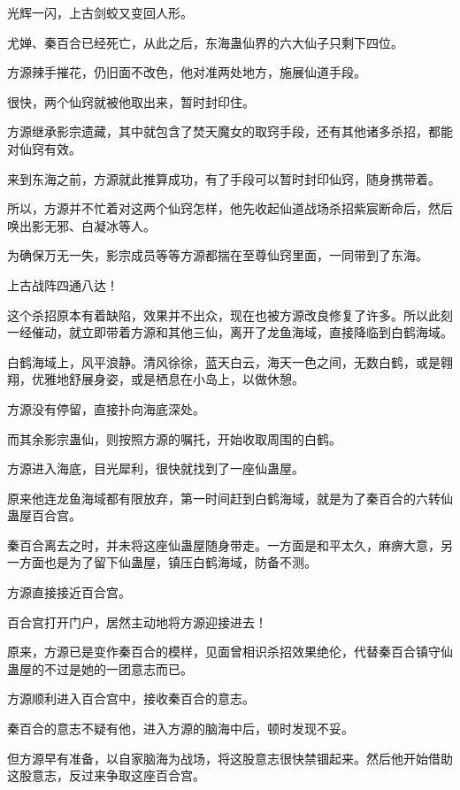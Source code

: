 
\begin{this_body}

光辉一闪，上古剑蛟又变回人形。

尤婵、秦百合已经死亡，从此之后，东海蛊仙界的六大仙子只剩下四位。

方源辣手摧花，仍旧面不改色，他对准两处地方，施展仙道手段。

很快，两个仙窍就被他取出来，暂时封印住。

方源继承影宗遗藏，其中就包含了焚天魔女的取窍手段，还有其他诸多杀招，都能对仙窍有效。

来到东海之前，方源就此推算成功，有了手段可以暂时封印仙窍，随身携带着。

所以，方源并不忙着对这两个仙窍怎样，他先收起仙道战场杀招紫宸断命后，然后唤出影无邪、白凝冰等人。

为确保万无一失，影宗成员等等方源都揣在至尊仙窍里面，一同带到了东海。

上古战阵四通八达！

这个杀招原本有着缺陷，效果并不出众，现在也被方源改良修复了许多。所以此刻一经催动，就立即带着方源和其他三仙，离开了龙鱼海域，直接降临到白鹤海域。

白鹤海域上，风平浪静。清风徐徐，蓝天白云，海天一色之间，无数白鹤，或是翱翔，优雅地舒展身姿，或是栖息在小岛上，以做休憩。

方源没有停留，直接扑向海底深处。

而其余影宗蛊仙，则按照方源的嘱托，开始收取周围的白鹤。

方源进入海底，目光犀利，很快就找到了一座仙蛊屋。

原来他连龙鱼海域都有限放弃，第一时间赶到白鹤海域，就是为了秦百合的六转仙蛊屋百合宫。

秦百合离去之时，并未将这座仙蛊屋随身带走。一方面是和平太久，麻痹大意，另一方面也是为了留下仙蛊屋，镇压白鹤海域，防备不测。

方源直接接近百合宫。

百合宫打开门户，居然主动地将方源迎接进去！

原来，方源已是变作秦百合的模样，见面曾相识杀招效果绝伦，代替秦百合镇守仙蛊屋的不过是她的一团意志而已。

方源顺利进入百合宫中，接收秦百合的意志。

秦百合的意志不疑有他，进入方源的脑海中后，顿时发现不妥。

但方源早有准备，以自家脑海为战场，将这股意志很快禁锢起来。然后他开始借助这股意志，反过来争取这座百合宫。


\end{this_body}
